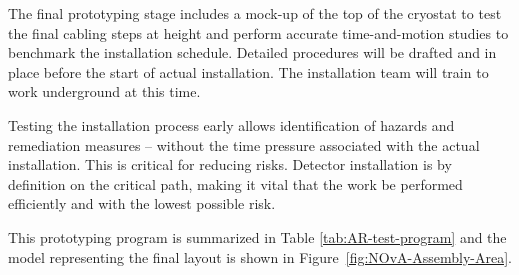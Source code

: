 The final prototyping stage includes a mock-up of the top of the cryostat to test the final cabling steps at height and perform  accurate time-and-motion studies to benchmark the installation schedule. Detailed procedures will be drafted and in place before the start of actual installation. The installation team will train to work underground at this time.


Testing the installation process early allows identification of  hazards and remediation measures -- without the time pressure associated with the actual installation. This is critical for reducing risks.  Detector installation is by definition on the critical path, making it vital that the work be performed efficiently and with the lowest possible risk. 

This prototyping program is summarized in Table \ref{tab:AR-test-program} and the \threed model representing the final layout is shown in Figure~\ref{fig:NOvA-Assembly-Area}. 

